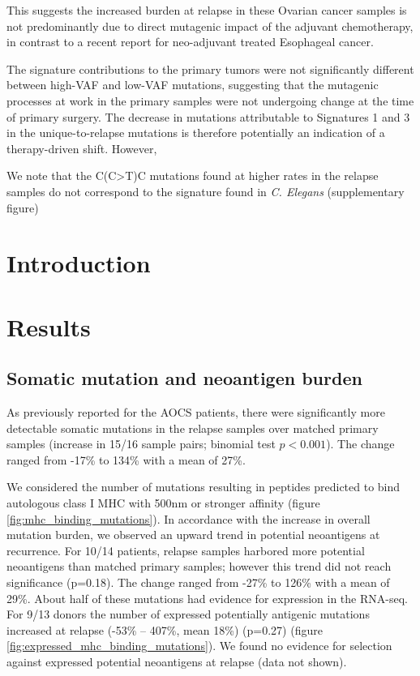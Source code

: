 This suggests the increased burden at relapse in these Ovarian cancer samples is not predominantly due to direct mutagenic impact of the adjuvant chemotherapy, in contrast to a recent report for neo-adjuvant treated Esophageal cancer.
 
The signature contributions to the primary tumors were not significantly different between high-VAF and low-VAF mutations, suggesting that the mutagenic processes at work in the primary samples were not undergoing change at the time of primary surgery. The decrease in mutations attributable to Signatures 1 and 3 in the unique-to-relapse mutations is therefore potentially an indication of a therapy-driven shift. However, 

We note that the C(C>T)C mutations found at higher rates in the relapse samples do not correspond to the signature found in \textit{C. Elegans} (supplementary figure)


\iffalse

\section*{Introduction}




\section*{Results}
\subsection*{Somatic mutation and neoantigen burden}

As previously reported for the AOCS patients, there were significantly more detectable somatic mutations in the relapse samples over matched primary samples (increase in 15/16 sample pairs; binomial test $p \lt 0.001$). The change ranged from -17\% to 134\% with a mean of 27\%.

We considered the number of mutations resulting in peptides predicted to bind autologous class I MHC with 500nm or stronger affinity (figure \ref{fig:mhc_binding_mutations}). In accordance with the increase in overall mutation burden, we observed an upward trend in potential neoantigens at recurrence. For 10/14 patients, relapse samples harbored more potential neoantigens than matched primary samples; however this trend did not reach significance (p=0.18). The change ranged from -27\% to 126\% with a mean of 29\%. About half of these mutations had evidence for expression in the RNA-seq. For 9/13 donors the number of expressed potentially antigenic mutations increased at relapse (-53\% -- 407\%, mean 18\%) (p=0.27) (figure \ref{fig:expressed_mhc_binding_mutations}). We found no evidence for selection against expressed potential neoantigens at relapse (data not shown).

